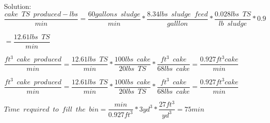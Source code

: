 \begin{enumerate}[1.]
Solution:\\
\vspace{0.2cm}
{$\dfrac{cake \enspace TS \enspace produced - lbs}{min}= \dfrac {60 gallons \enspace sludge}{min}*\dfrac {8.34 lbs \enspace sludge \enspace feed}{galllon}*\dfrac{0.028 lbs \enspace TS}{lb \enspace sludge}*0.9$}\\
\vspace{3mm}

{$=\dfrac{12.61lbs \enspace TS}{min}$}\\
\vspace{3mm}

{$\dfrac{ft^3 \enspace cake \enspace produced}{min}=\dfrac{12.61lbs \enspace TS}{min}*\dfrac{100 lbs \enspace cake}{20lbs \enspace TS}*\dfrac{ft^3 \enspace cake}{68 lbs \enspace cake} = \dfrac{0.927ft^3 cake}{min}$}\\
\vspace{3mm}

{$\dfrac{ft^3 \enspace cake \enspace produced}{min}=\dfrac{12.61lbs \enspace TS}{min}*\dfrac{100 lbs \enspace cake}{20lbs \enspace TS}*\dfrac{ft^3 \enspace cake}{68 lbs \enspace cake} = \dfrac{0.927ft^3 cake}{min}$}\\
\vspace{3mm}

{$Time \enspace required \enspace to \enspace fill \enspace the \enspace bin=\dfrac{min}{0.927ft^3}*{3yd^3}*\dfrac{27ft^3}{yd^3}=\boxed{75min}$}\\


\end{enumerate}


